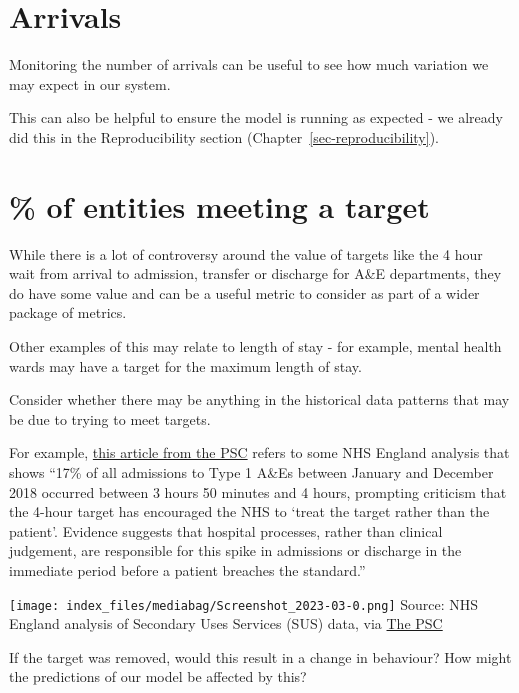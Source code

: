\documentclass[
  letterpaper,
  DIV=11,
  numbers=noendperiod]{scrreprt}
\begin{document}
\section{Arrivals}\label{arrivals}

Monitoring the number of arrivals can be useful to see how much
variation we may expect in our system.

This can also be helpful to ensure the model is running as expected - we
already did this in the Reproducibility section
(Chapter~\ref{sec-reproducibility}).

\section{\% of entities meeting a
target}\label{of-entities-meeting-a-target}

While there is a lot of controversy around the value of targets like the
4 hour wait from arrival to admission, transfer or discharge for A\&E
departments, they do have some value and can be a useful metric to
consider as part of a wider package of metrics.

Other examples of this may relate to length of stay - for example,
mental health wards may have a target for the maximum length of stay.

\begin{tcolorbox}[enhanced jigsaw, rightrule=.15mm, colback=white, colframe=quarto-callout-warning-color-frame, colbacktitle=quarto-callout-warning-color!10!white, toprule=.15mm, coltitle=black, opacityback=0, titlerule=0mm, bottomtitle=1mm, breakable, title=\textcolor{quarto-callout-warning-color}{\faExclamationTriangle}\hspace{0.5em}{Warning}, opacitybacktitle=0.6, toptitle=1mm, arc=.35mm, bottomrule=.15mm, leftrule=.75mm, left=2mm]

Consider whether there may be anything in the historical data patterns
that may be due to trying to meet targets.

For example,
\href{https://thepsc.co.uk/news-insights/entry/reaffirming-the-nhs-4-hour-ae-target-why-it-matters}{this
article from the PSC} refers to some NHS England analysis that shows
``17\% of all admissions to Type 1 A\&Es between January and December
2018 occurred between 3 hours 50 minutes and 4 hours, prompting
criticism that the 4-hour target has encouraged the NHS to `treat the
target rather than the patient'. Evidence suggests that hospital
processes, rather than clinical judgement, are responsible for this
spike in admissions or discharge in the immediate period before a
patient breaches the standard.''

\texttt{[image: index\_files/mediabag/Screenshot\_2023-03-0.png]} Source:
NHS England analysis of Secondary Uses Services (SUS) data, via
\href{https://thepsc.co.uk/news-insights/entry/reaffirming-the-nhs-4-hour-ae-target-why-it-matters}{The
PSC}

If the target was removed, would this result in a change in behaviour?
How might the predictions of our model be affected by this?

\end{tcolorbox}
\end{document}
